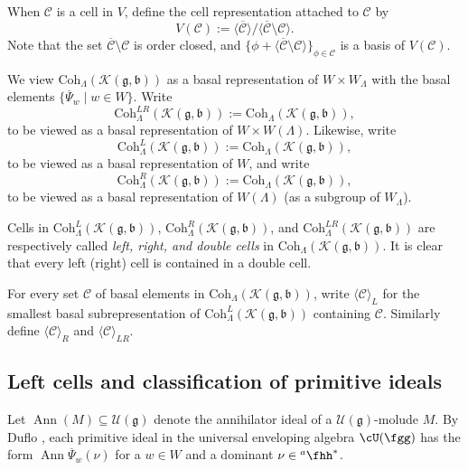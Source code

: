 \documentclass[12pt]{amsart}
\def\subset{\subseteq}
\newcommand{\CC}{{\mathcal {C}}}
\newcommand{\CK}{{\mathcal {K}}}
\DeclareMathOperator{\Ann}{Ann}
\newcommand{\g}{\mathfrak g}
\renewcommand{\b}{\mathfrak b}
\newcommand{\la}{\langle}
\newcommand{\ra}{\rangle}
\numberwithin{equation}{section}
\theoremstyle{remark}
\def\hha{{}^a\fhh}
\def\ahh{\hha}
\def\Coh{\mathrm{Coh}}
\def\bPsi{\overline{\Psi}}
\begin{document}
When $\CC$ is a cell in $V$, define the cell representation attached to $\CC$ by
\[
V(\CC):=\la \overline \CC \ra/ \la \overline \CC\setminus \CC\ra.
\]
Note that the set $ \overline \CC\setminus \CC$ is order closed,
and $\{\phi+ \la \overline \CC\setminus \CC\ra\}_{ \phi\in \CC}$ is a basis of $V(\CC)$.


We view $\Coh_{\Lambda}( \CK(\g,\b))$ as a basal representation of $W\times W_\Lambda$ with the basal elements
 $\{\overline \Psi_{w}\mid w\in W\}$.
Write
\begin{equation}\label{eq:LRO}
\Coh^{LR}_{\Lambda}( \CK(\g,\b)):=\Coh_{\Lambda}( \CK(\g,\b)),
\end{equation}
 to be viewed as a basal representation of $W\times W(\Lambda)$.
Likewise, write
\[
\Coh^{L}_{\Lambda}( \CK(\g,\b)):=\Coh_{\Lambda}( \CK(\g,\b)),
\]
 to be viewed as a basal representation of $W$, and write
 \[
 \Coh^{R}_{\Lambda}( \CK(\g,\b)):=\Coh_{\Lambda}( \CK(\g,\b)),
 \]
  to be viewed as a basal representation of $W(\Lambda)$ (as a subgroup of $W_\Lambda$).

Cells in $\Coh^{L}_{\Lambda}( \CK(\g,\b))$, $\Coh^{R}_{\Lambda}( \CK(\g,\b))$,
and $\Coh^{LR}_{\Lambda}( \CK(\g,\b))$ are respectively called
\emph{left, right, and double cells} in  $\Coh_{\Lambda}( \CK(\g,\b))$.
It is clear that every left (right) cell is contained in a double cell.

For every set $\CC$ of basal elements in $\Coh_{\Lambda}( \CK(\g,\b))$,
write $\la \CC\ra_L$ for the smallest basal subrepresentation
of $\Coh^L_{\Lambda}( \CK(\g,\b))$ containing $\CC$.
Similarly define $\la \CC\ra_R$ and $\la \CC\ra_{LR}$.



\subsection{Left cells and classification of primitive ideals}\label{sec:primitive}
Let $\Ann(M)\subset \mathcal U(\g)$ denote the
annihilator ideal of a $\mathcal U(\g)$-molude $M$.
By Duflo \cite[Theorem~1]{Du77}, each primitive ideal in the universal
enveloping algebra $\cU(\fgg)$ has the form %
$\Ann \bPsi_w(\nu)$ for a $w\in W$ and a dominant $\nu\in \ahh^*$.
\end{document}
